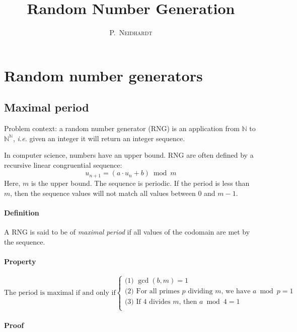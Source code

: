 \documentclass[10pt,a4paper]{article}
\title{Random Number Generation}
\author{\textsc{P.~Neidhardt}}
\def\ie{\textsl{i.e.}\xspace}
\def\N{\mathbb{N}}
\begin{document}
\maketitle
\vfill
\thispagestyle{empty}


\section{Random number generators}

\subsection{Maximal period}

Problem context: a random number generator (RNG) is an application from $\N$
to $\N^\N$, \ie{} given an integer it will return an integer sequence.

In computer science, numbers have an upper bound. RNG are often defined by a
recursive linear congruential sequence:
\[
u_{n+1} = (a \cdot u_n + b) \bmod m
\]
Here, $m$ is the upper bound. The sequence is periodic.
If the period is less than $m$, then the sequence values will not match all
values between $0$ and $m-1$.


\paragraph{Definition}
A RNG is said to be of \emph{maximal period} if all values of the codomain
are met by the sequence.

\paragraph{Property}

\[
\text{The period is maximal if and only if}
\left\{
  \begin{array}{l}
    \text{(1) } \gcd(b,m) = 1 \\
    \text{(2) } \text{For all primes $p$ dividing $m$, we have } a \bmod p = 1 \\
    \text{(3) } \text{If 4 divides $m$, then } a \bmod 4 = 1 \\
  \end{array}
\right.
\]



\paragraph{Proof}
\end{document}
